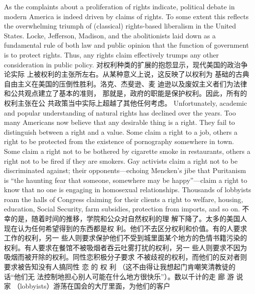 \begin{paracol}{2}

As the complaints about a proliferation of rights indicate, political debate in modern America is indeed driven by claims of
rights. To some extent this reflects the overwhelming triumph
of (classical) rights-based liberalism in the United States.
Locke, Jefferson, Madison, and the abolitionists laid down as a
fundamental rule of both law and public opinion that the function of government is to protect rights. Thus, any rights
claim effectively trumps any other consideration in public
policy.
\switchcolumn
对权利种类的扩展的抱怨显示，现代美国的政治争论实际
上被权利的主张所左右。从某种意义上说，这反映了以权利为
基础的古典自由主义在美国的压倒性胜利。洛克、杰斐逊、麦
迪逊以及废奴主义者们为法律和公共观点建立了基本的准则，
那就是，政府的职能是保护权利。因此，所有的权利主张在公
共政策当中实际上超越了其他任何考虑。
\switchcolumn*
Unfortunately, academic and popular understanding of natural rights has declined over the years. Too many Americans
now believe that any desirable thing is a right. They fail to distinguish between a right and a value. Some claim a right to a
job, others a right to be protected from the existence of pornography somewhere in town. Some claim a right not to be bothered by cigarette smoke in restaurants, others a right not to be
fired if they are smokers. Gay activists claim a right not to be
discriminated against; their opponents---echoing Mencken's
jibe that Puritanism is ``the haunting fear that someone, somewhere may be happy''---claim a right to know that no one is engaging in homosexual relationships. Thousands of lobbyists
roam the halls of Congress claiming for their clients a right to
welfare, housing, education, Social Security, farm subsidies,
protection from imports, and so on.
\switchcolumn
不幸的是，随着时间的推移，学院和公众对自然权利的理
解下降了。太多的美国人现在认为任何希望得到的东西都是权
利。他们不去区分权利和价值。有的人要求工作的权利，另一
些人则要求保护他们不受到城里面某个地方的色情书籍污染的
权利。有人要求在餐馆不被吸烟者吞云吐雾打扰的权利，另一
些人则要求不因为吸烟而被开除的权利。同性恋积极分子要求
不被歧视的权利，而他们的反对者则要求被告知没有人搞同性
恋 的 权 利 （这不由得让我想起门肯嘲笑清教徒的话“他们无
法控制地担心别人可能在什么地方很快乐”）。数以千计的走
廊 游 说 家 （lobbyists）游荡在国会的大厅里面，为他们的客户

\end{paracol}
